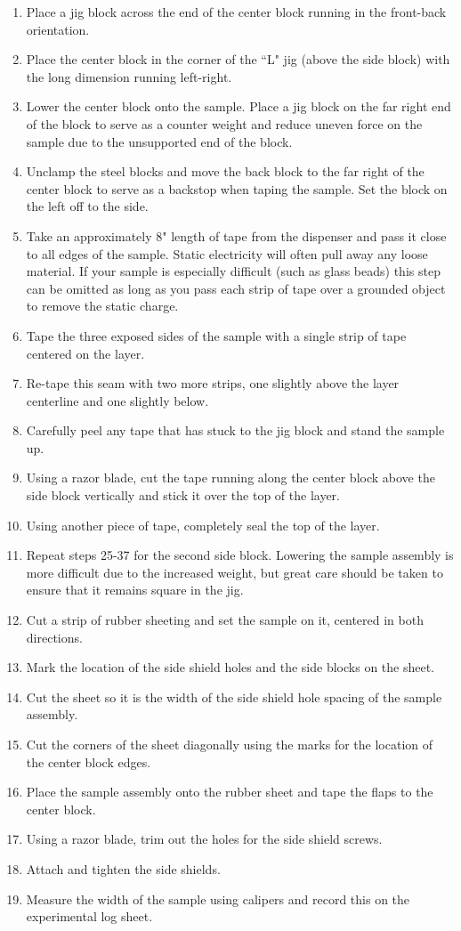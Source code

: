 \begin{enumerate}
\item Place a jig block across the end of the center block running in the front-back orientation.
\item Place the center block in the corner of the ``L" jig (above the side block) with the long dimension running left-right.
\item Lower the center block onto the sample. Place a jig block on the far right end of the block to serve as a counter weight and reduce uneven force on the sample due to the unsupported end of the block.
\item Unclamp the steel blocks and move the back block to the far right of the center block to serve as a backstop when taping the sample. Set the block on the left off to the side.
\item Take an approximately 8" length of tape from the dispenser and pass it close to all edges of the sample. Static electricity will often pull away any loose material. If your sample is especially difficult (such as glass beads) this step can be omitted as long as you pass each strip of tape over a grounded object to remove the static charge.
\item Tape the three exposed sides of the sample with a single strip of tape centered on the layer.
\item Re-tape this seam with two more strips, one slightly above the layer centerline and one slightly below.
\item Carefully peel any tape that has stuck to the jig block and stand the sample up.
\item Using a razor blade, cut the tape running along the center block above the side block vertically and stick it over the top of the layer.
\item Using another piece of tape, completely seal the top of the layer.
\item Repeat steps 25-37 for the second side block. Lowering the sample assembly is more difficult due to the increased weight, but great care should be taken to ensure that it remains square in the jig.
\item Cut a strip of rubber sheeting and set the sample on it, centered in both directions.
\item Mark the location of the side shield holes and the side blocks on the sheet.
\item Cut the sheet so it is the width of the side shield hole spacing of the sample assembly.
\item Cut the corners of the sheet diagonally using the marks for the location of the center block edges.
\item Place the sample assembly onto the rubber sheet and tape the flaps to the center block.
\item Using a razor blade, trim out the holes for the side shield screws.
\item Attach and tighten the side shields.
\item Measure the width of the sample using calipers and record this on the experimental log sheet.
\end{enumerate}

